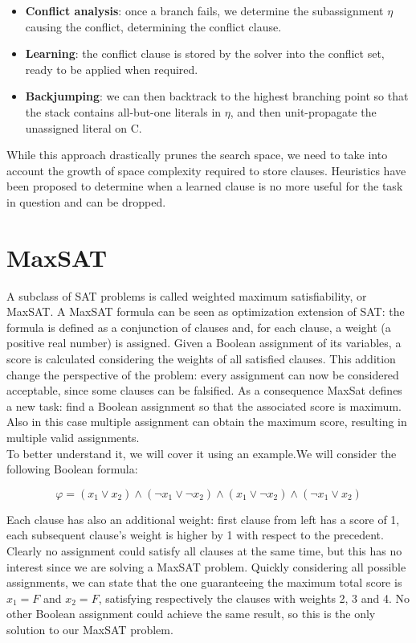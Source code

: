\begin{itemize}
    \item \textbf{Conflict analysis}: once a branch fails, we determine the subassignment $\eta$ causing the conflict, determining the conflict clause.
    \item \textbf{Learning}: the conflict clause is stored by the solver into the conflict set, ready to be applied when required.
    \item \textbf{Backjumping}: we can then backtrack to the highest branching point so that the stack contains all-but-one literals in $\eta$, and then unit-propagate the unassigned literal on C.
\end{itemize}

While this approach drastically prunes the search space, we need to take into account the growth of space complexity required to store clauses. Heuristics have been proposed to determine when a learned clause is no more useful for the task in question and can be dropped.


\section{MaxSAT}
A subclass of SAT problems is called weighted maximum satisfiability, or MaxSAT. A MaxSAT formula can be seen as optimization extension of SAT: the formula is defined as a conjunction of clauses and, for each clause, a weight (a positive real number) is assigned. Given a Boolean assignment of its variables, a score is calculated considering the weights of all satisfied clauses. This addition change the perspective of the problem: every assignment can now be considered acceptable, since some clauses can be falsified. As a consequence MaxSat defines a new task: find a Boolean assignment so that the associated score is maximum. Also in this case multiple assignment can obtain the maximum score, resulting in multiple valid assignments. \\
To better understand it, we will cover it using an example.We will consider the following Boolean formula:

\begin{equation}
    \varphi = ( x_1 \vee x_2) \wedge (\neg x_1 \vee \neg x_2) \wedge ( x_1 \vee \neg x_2) \wedge (\neg x_1 \vee x_2)
\end{equation}

Each clause has also an additional weight: first clause from left has a score of 1, each subsequent clause's weight is higher by 1 with respect to the precedent. Clearly no assignment could satisfy all clauses at the same time, but this has no interest since we are solving a MaxSAT problem. Quickly considering all possible assignments, we can state that the one guaranteeing the maximum total score is $x_1 = F$ and $x_2 = F$, satisfying respectively the clauses with weights 2, 3 and 4. No other Boolean assignment could achieve the same result, so this is the only solution to our MaxSAT problem.

